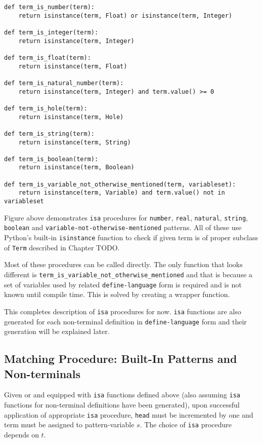 \begin{lstlisting}
def term_is_number(term):
    return isinstance(term, Float) or isinstance(term, Integer)

def term_is_integer(term):
    return isinstance(term, Integer) 

def term_is_float(term):
    return isinstance(term, Float) 

def term_is_natural_number(term):
    return isinstance(term, Integer) and term.value() >= 0

def term_is_hole(term):
    return isinstance(term, Hole) 

def term_is_string(term):
    return isinstance(term, String) 

def term_is_boolean(term):
    return isinstance(term, Boolean) 

def term_is_variable_not_otherwise_mentioned(term, variableset):
    return isinstance(term, Variable) and term.value() not in variableset
\end{lstlisting}

Figure above demonstrates \texttt{isa} procedures for \texttt{number}, \texttt{real}, \texttt{natural}, \texttt{string}, \texttt{boolean} and \texttt{variable-not-otherwise-mentioned} patterns. All of these use Python's built-in \texttt{isinstance} function to check if given term is of proper subclass of \texttt{Term} described in Chapter TODO.

Most of these procedures can be called directly. The only function that looks different is \texttt{term\_is\_variable\_not\_otherwise\_mentioned} and that is because a set of variables used by related \texttt{define-language} form is required and is not known until compile time. This is solved by creating a wrapper function. 

This completes description of \texttt{isa} procedures for now. \texttt{isa} functions are also generated for each non-terminal definition in \texttt{define-language} form and their generation will be explained later.


\subsection{Matching Procedure: Built-In Patterns and Non-terminals}
Given \BuiltInPattern or \Nt and equipped with \texttt{isa} functions defined above (also assuming \texttt{isa} functions for non-terminal definitions have been generated), upon successful application of appropriate \texttt{isa} procedure, \texttt{head} must be incremented by one and term must be assigned to pattern-variable $s$. The choice of \texttt{isa} procedure depends on $t$.

